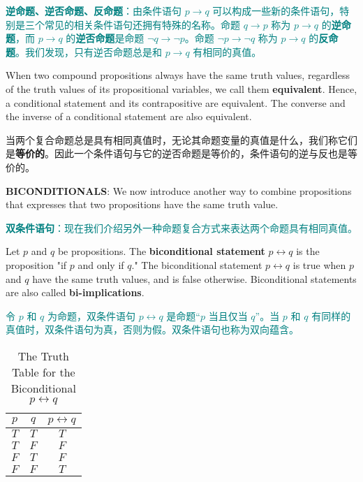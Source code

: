 \documentclass[12pt, a4paper]{article} %
\begin{document}
\textcolor{teal}{
    \textbf{逆命题、逆否命题、反命题}：由条件语句 $p \to q$ 可以构成一些新的条件语句，特别是三个常见的相关条件语句还拥有特殊的名称。命题 $q \to p$ 称为 $p \to q$ 的\textbf{逆命题}，而 $p \to q$ 的\textbf{逆否命题}是命题 $\neg q \to \neg p$。命题 $\neg p \to \neg q$ 称为 $p \to q$ 的\textbf{反命题}。我们发现，只有逆否命题总是和 $p \to q$ 有相同的真值。
}

When two compound propositions always have the same truth values, regardless of the truth values of its propositional variables, we call them \textbf{equivalent}. Hence, a conditional statement and its contrapositive are equivalent. The converse and the inverse of a conditional statement are also equivalent.

当两个复合命题总是具有相同真值时，无论其命题变量的真值是什么，我们称它们是\textbf{等价的}。因此一个条件语句与它的逆否命题是等价的，条件语句的逆与反也是等价的。

\textbf{BICONDITIONALS}:
We now introduce another way to combine propositions that expresses that two propositions have the same truth value.

\textcolor{teal}{
    \textbf{双条件语句}：现在我们介绍另外一种命题复合方式来表达两个命题具有相同真值。
}

\begin{definition}
    Let $p$ and $q$ be propositions. The \textbf{biconditional statement} $p \leftrightarrow q$ is the proposition "if $p$ and only if $q$." The biconditional statement $p \leftrightarrow q$ is true when $p$ and $q$ have the same truth values, and is false otherwise. Biconditional statements are also called \textbf{bi-implications}.
\end{definition}

\begin{theorem}
    \textcolor{teal}{
        令 $p$ 和 $q$ 为命题，双条件语句 $p \leftrightarrow q$ 是命题“$p$ 当且仅当 $q$”。当 $p$ 和 $q$ 有同样的真值时，双条件语句为真，否则为假。双条件语句也称为双向蕴含。
    }
\end{theorem}

\begin{table}[H]
    \centering
    \caption{The Truth Table for the Biconditional $p \leftrightarrow q$}
    \begin{tabular}{cc|c}
        \toprule
        $p$ & $q$ & $p \leftrightarrow q$ \\
        \midrule
        $T$ & $T$ & $T$                   \\
        $T$ & $F$ & $F$                   \\
        $F$ & $T$ & $F$                   \\
        $F$ & $F$ & $T$                   \\
        \bottomrule
    \end{tabular}%
    \label{tab:6}%
\end{table}%
\end{document}
